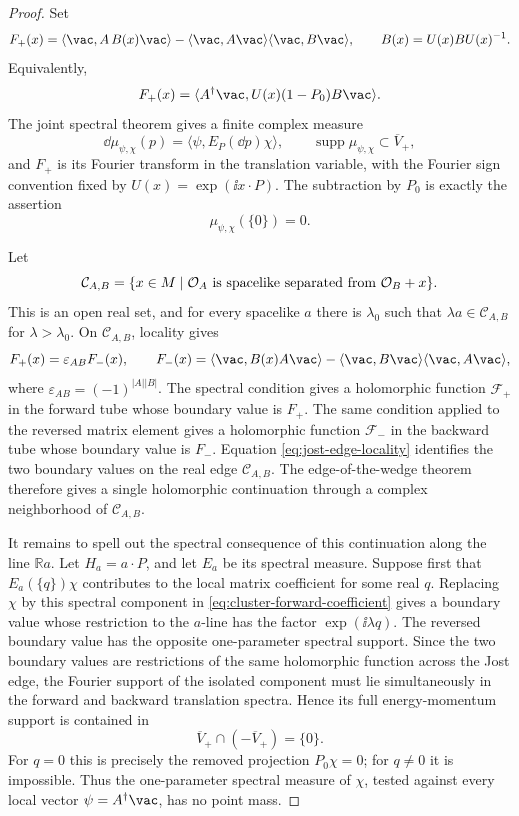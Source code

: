 \begin{proof}
Set
\[
  F_+(x)=
  \langle\vac,A\,B(x)\vac\rangle
  -
  \langle\vac,A\vac\rangle\langle\vac,B\vac\rangle ,
  \qquad
  B(x)=U(x)BU(x)^{-1}.
\]
Equivalently,
\begin{equation}
  F_+(x)=\langle A^\dagger\vac,U(x)(1-P_0)B\vac\rangle .
  \label{eq:cluster-forward-coefficient}
\end{equation}
The joint spectral theorem gives a finite complex measure
\[
  \dd\mu_{\psi,\chi}(p)=\langle\psi,E_P(\dd p)\chi\rangle,
  \qquad
  \operatorname{supp}\mu_{\psi,\chi}\subset\overline V_+,
\]
and \(F_+\) is its Fourier transform in the translation variable, with the
Fourier sign convention fixed by \(U(x)=\exp(\ii x\cdot P)\).  The subtraction
by \(P_0\) is exactly the assertion
\begin{equation}
  \mu_{\psi,\chi}(\{0\})=0 .
  \label{eq:cluster-zero-atom-removed}
\end{equation}

Let
\[
  \mathcal C_{A,B}
  =
  \{x\in M\mid
    \mathcal O_A\hbox{ is spacelike separated from }\mathcal O_B+x\}.
\]
This is an open real set, and for every spacelike \(a\) there is
\(\lambda_0\) such that \(\lambda a\in\mathcal C_{A,B}\) for
\(\lambda>\lambda_0\).  On \(\mathcal C_{A,B}\), locality gives
\begin{equation}
  F_+(x)=\varepsilon_{AB}F_-(x),
  \qquad
  F_-(x)=
  \langle\vac,B(x)A\vac\rangle
  -
  \langle\vac,B\vac\rangle\langle\vac,A\vac\rangle ,
  \label{eq:jost-edge-locality}
\end{equation}
where \(\varepsilon_{AB}=(-1)^{|A||B|}\).  The spectral condition gives a
holomorphic function \(\mathcal F_+\) in the forward tube whose boundary value
is \(F_+\).  The same condition applied to the reversed matrix element gives a
holomorphic function \(\mathcal F_-\) in the backward tube whose boundary
value is \(F_-\).  Equation \eqref{eq:jost-edge-locality} identifies the two
boundary values on the real edge \(\mathcal C_{A,B}\).  The
edge-of-the-wedge theorem therefore gives a single holomorphic continuation
through a complex neighborhood of \(\mathcal C_{A,B}\).

It remains to spell out the spectral consequence of this continuation along
the line \(\mathbb R a\).  Let \(H_a=a\cdot P\), and let \(E_a\) be its spectral
measure.  Suppose first that \(E_a(\{q\})\chi\) contributes to the local
matrix coefficient for some real \(q\).  Replacing \(\chi\) by this spectral
component in \eqref{eq:cluster-forward-coefficient} gives a boundary value
whose restriction to the \(a\)-line has the factor
\(\exp(\ii\lambda q)\).  The reversed boundary value has the opposite
one-parameter spectral support.  Since the two boundary values are restrictions
of the same holomorphic function across the Jost edge, the Fourier support of
the isolated component must lie simultaneously in the forward and backward
translation spectra.  Hence its full energy-momentum support is contained in
\[
  \overline V_+\cap(-\overline V_+)=\{0\}.
\]
For \(q=0\) this is precisely the removed projection \(P_0\chi=0\); for
\(q\ne0\) it is impossible.  Thus the one-parameter spectral measure of
\(\chi\), tested against every local vector \(\psi=A^\dagger\vac\), has no
point mass.


\end{proof}
